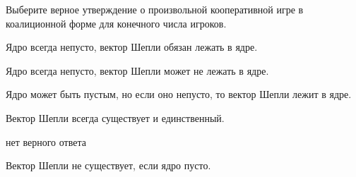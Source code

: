 
\begin{question}
Выберите верное утверждение о произвольной кооперативной игре в коалиционной форме для конечного числа игроков.
\begin{answerlist}
  \item Ядро всегда непусто, вектор Шепли обязан лежать в ядре.
  \item Ядро всегда непусто, вектор Шепли может не лежать в ядре.
  \item Ядро может быть пустым, но если оно непусто, то вектор Шепли лежит в ядре.
  \item Вектор Шепли всегда существует и единственный.
  \item нет верного ответа
  \item Вектор Шепли не существует, если ядро пусто.
\end{answerlist}
\end{question}


